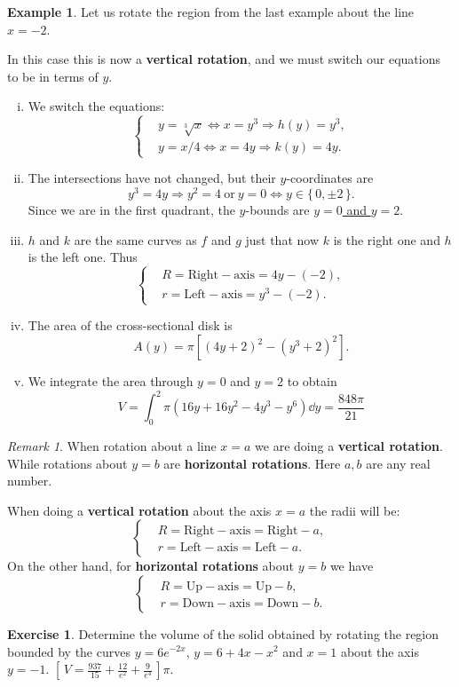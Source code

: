 \documentclass[12pt]{article}
\theoremstyle{plain}
\theoremstyle{definition}
\newtheorem{Ex}[Th]{Example}           %
\newtheorem{Ej}[Th]{Exercise}         %
\theoremstyle{remark}
\newtheorem*{Rmk}{Remark}      %
\renewcommand{\:}{\colon}           %
\newcommand{\un}[1]{\underline{#1}}
\renewcommand{\.}{\Cdot}                %
\newcommand{\To}{\Rightarrow}
\newcommand{\set}[1]{\{\,#1\,\}}    %
\newcommand{\bonj}[1]{\left\lbrack\,#1\,\right\rbrack}
\begin{document}
\begin{multicols}{2}
\begin{Ex}
  Let us rotate the region from the last example about the line $x=-2$.\par 
  In this case this is now a \textbf{vertical rotation}, and we must switch our equations to be in terms of $y$.
  \begin{enumerate}[i)]
    \itemsep=-0.4em
    \item We switch the equations:
    $$
    \left\lbrace
    \begin{aligned}
      &y=\sqrt[3]{x}\iff x=y^3\To h(y)=y^3,\\
      &y=x/4\iff x=4y\To k(y)=4y.
    \end{aligned}
    \right.
    $$
    \item The intersections have not changed, but their $y$-coordinates are 
    $$y^3=4y\To y^2=4\ \text{or}\ y=0 \iff y\in\set{0,\pm 2}.$$
    Since we are in the first quadrant, the $y$-bounds are \un{$y=0$ and $y=2$}.
    \item $h$ and $k$ are the same curves as $f$ and $g$ just that now $k$ is the right one and $h$ is the left one. Thus 
    $$
    \left\lbrace
    \begin{aligned}
      &R=\text{Right}-\text{axis}=4y-(-2),\\
      &r=\text{Left}-\text{axis}=y^3-(-2).
    \end{aligned}
    \right.
    $$
    \item The area of the cross-sectional disk is 
    $$A(y)=\pi\left\lbrack(4y+2)^2-(y^3+2)^2\right\rbrack.$$
    \item We integrate the area through $y=0$ and $y=2$ to obtain 
    $$V=\int_0^2\pi (16 y + 16 y^2 - 4 y^3 - y^6)\dd y=\frac{848\pi}{21}$$
  \end{enumerate}
\end{Ex}
\begin{ptcb}
\begin{Rmk}
When rotation about a line $x=a$ we are doing a \textbf{vertical rotation}. While rotations about $y=b$ are \textbf{horizontal rotations}. Here $a,b$ are any real number.\par 
When doing a \textbf{vertical rotation} about the axis $x=a$ the radii will be:
$$
\left\lbrace
\begin{aligned}
&R=\text{Right}-\text{axis}=\text{Right}-a,\\
 &r=\text{Left}-\text{axis}=\text{Left}-a.
\end{aligned}
\right.
 $$
On the other hand, for \textbf{horizontal rotations} about $y=b$ we have 
$$
\left\lbrace
\begin{aligned}
&R=\text{Up}-\text{axis}=\text{Up}-b,\\
 &r=\text{Down}-\text{axis}=\text{Down}-b.
\end{aligned}
\right.
 $$
\end{Rmk}
\end{ptcb}
\begin{Ej}
  Determine the volume of the solid obtained by rotating the region bounded by the curves $y=6e^{-2x}$, $y=6+4x-x^2$ and $x=1$ about the axis $y=-1$. $\bonj{V=\frac{937}{15}+\frac{12}{e^2}+\frac{9}{e^4}}\pi$.
  \end{Ej}


\end{multicols}
\end{document}
